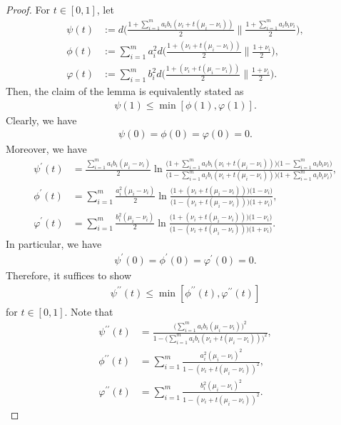 \documentclass[journal,draftcls, onecolumn]{IEEEtran}
\begin{document}
\begin{proof}
For $t \in [0,1]$, let 
\begin{align*}
\psi(t) &:= d\bigg( \frac{1+ \sum_{i=1}^m a_i b_i(\nu_i + t(\mu_i-\nu_i))}{2} \bigg\| \frac{1+\sum_{i=1}^m a_i b_i \nu_i}{2}\bigg), \\
\phi(t) &:= \sum_{i=1}^m a_i^2 d\bigg( \frac{1+(\nu_i + t(\mu_i-\nu_i))}{2} \bigg\| \frac{1+\nu_i}{2}\bigg), \\
\varphi(t) &:= \sum_{i=1}^m b_i^2 d\bigg( \frac{1+(\nu_i + t(\mu_i-\nu_i))}{2} \bigg\| \frac{1+\nu_i}{2} \bigg).
\end{align*}
Then, the claim of the lemma is equivalently stated as 
\begin{align*}
\psi(1) \le \min[ \phi(1), \varphi(1)].
\end{align*}
Clearly, we have
\begin{align*}
\psi(0) = \phi(0) = \varphi(0) = 0.
\end{align*}
Moreover, we have
\begin{align*}
\psi^\prime(t) &= \frac{\sum_{i=1}^m a_i b_i (\mu_i-\nu_i)}{2} \ln \frac{\big(1+\sum_{i=1}^m a_i b_i (\nu_i + t(\mu_i-\nu_i))\big)\big(1-\sum_{i=1}^m a_i b_i \nu_i\big)}{\big(1-\sum_{i=1}^m a_i b_i (\nu_i + t(\mu_i-\nu_i))\big) \big(1+ \sum_{i=1}^m a_i b_i \nu_i\big)}, \\
\phi^\prime(t) &= \sum_{i=1}^m \frac{a_i^2(\mu_i-\nu_i)}{2} \ln \frac{\big( 1+ (\nu_i + t(\mu_i - \nu_i))\big)\big(1-\nu_i\big)}{\big(1- (\nu_i + t(\mu_i-\nu_i))\big)\big(1+\nu_i \big)}, \\
\varphi^\prime(t) &= \sum_{i=1}^m \frac{b_i^2(\mu_i-\nu_i)}{2} \ln \frac{\big(1+(\nu_i+t(\mu_i-\nu_i))\big)\big(1-\nu_i\big)}{\big(1-(\nu_i+t(\mu_i-\nu_i))\big)\big(1+\nu_i\big)}.
\end{align*}
In particular, we have
\begin{align*}
\psi^\prime(0) = \phi^\prime(0) = \varphi^\prime(0) = 0.
\end{align*}
Therefore, it suffices to show 
\begin{align} \label{eq:proof-inner-product-convexity-0}
\psi^{\prime\prime}(t) \le \min[ \phi^{\prime\prime}(t), \varphi^{\prime\prime}(t)]
\end{align}
for $t \in [0,1]$. Note that
\begin{align*}
\psi^{\prime\prime}(t) &= \frac{\big(\sum_{i=1}^m a_i b_i (\mu_i-\nu_i)\big)^2}{1 - \big(\sum_{i=1}^m a_i b_i (\nu_i + t(\mu_i - \nu_i))\big)^2}, \\
\phi^{\prime\prime}(t) &= \sum_{i=1}^m \frac{a_i^2 (\mu_i-\nu_i)^2}{1 - (\nu_i +t(\mu_i-\nu_i))^2}, \\
\varphi^{\prime\prime}(t) &= \sum_{i=1}^m \frac{b_i^2(\mu_i-\nu_i)^2}{1 - (\nu_i + t(\mu_i-\nu_i))^2}.
\end{align*}


\end{proof}
\end{document}
